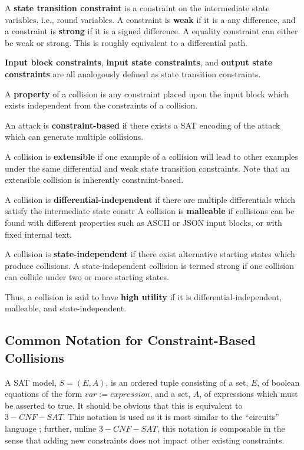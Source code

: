 \documentclass[letterpaper,twocolumn,10pt]{article}
\begin{document}
A \textbf{state transition constraint} is a constraint on the intermediate
state variables, i.e., round variables. A constraint is \textbf{weak} if
it is a any difference, and a constraint is \textbf{strong} if it is a
signed difference. A equality constraint can either be weak or strong. This
is roughly equivalent to a differential path.

\textbf{Input block constraints}, \textbf{input state constraints}, and
\textbf{output state constraints} are all analogously defined as state
transition constraints.

A \textbf{property} of a collision is any constraint placed upon the
input block which exists independent from the constraints of a collision.

An attack is \textbf{constraint-based} if there exists a SAT encoding of the
attack which can generate multiple collisions.

A collision is \textbf{extensible} if one example of a collision will lead to
other examples under the same differential and weak state transition constraints.
Note that an extensible collision is inherently constraint-based.

A collision is \textbf{differential-independent} if there are multiple
differentials which satisfy the intermediate state constr
A collision is \textbf{malleable} if collisions can be found with different
properties such as ASCII or JSON input blocks, or with fixed internal text.

A collision is \textbf{state-independent} if there exist alternative
starting states which produce collisions. A state-independent collision
is termed strong if one collision can collide under two or more starting
states.

Thus, a collision is said to have \textbf{high utility} if it is
differential-independent, malleable, and state-independent.

\subsection{Common Notation for Constraint-Based Collisions}
A SAT model, $S = (E, A)$, is an ordered tuple consisting of a set, $E$, of
boolean equations of the form $var := expression$, and a set, $A$, of expressions
which must be asserted to true. It should be obvious that this is equivalent
to $3-CNF-SAT$. This notation is used as it is most similar to the ``circuits''
language \cite{circuits}; further, unline $3-CNF-SAT$, this notation is composable
in the sense that adding new constraints does not impact other existing constraints.
\end{document}
